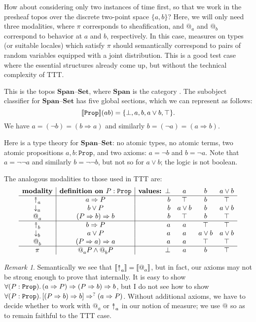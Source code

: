 \documentclass[11pt, oneside, article]{memoir}
\makeatletter
\theoremstyle{plain}
\theoremstyle{definition}
\theoremstyle{remark}
\newtheorem{remark}[theorem]{Remark}
\DeclarePairedDelimiter{\church}{\llbracket}{\rrbracket}
\newcommand{\const}[1]{\mathtt{#1}}
\newcommand{\Cat}[1]{\mathbf{#1}}
\newcommand{\smset}{\Cat{Set}}
\newcommand{\from}{\leftarrow}
\newcommand{\Prop}{\const{Prop}}
\newcommand{\AtSymbol}{{@}}
\newcommand{\SeeSymbol}{{\down}}  %
\newcommand{\InSymbol}{{\upclose}}%
\newcommand{\At}[2][]{\AtSymbol^{#1}_{#2}}
\newcommand{\See}[2][]{\SeeSymbol^{#1}_{#2}}
\newcommand{\In}[2][]{\InSymbol^{#1}_{#2}}
\newcommand{\upclose}{{\rotatebox[origin=c]{90}{$\twoheadrightarrow$}}}
\newcommand{\down}{\mathord{\downarrow}}
\newcommand{\imp}{\Rightarrow}
\newcommand{\Span}{\Cat{Span}}
\newcommand{\set}{\text{--}\smset}
\makeatother
\begin{document}

How about considering only two instances of time first, so that we work in the presheaf topos over the discrete two-point space $\{a,b\}$? Here, we will only need three modalities, where $\pi$ corresponds to sheafification, and $\At{a}{}$ and $\At{b}{}$ correspond to behavior at $a$ and $b$, respectively. In this case, measures on types (or suitable locales) which satisfy $\pi$ should semantically correspond to pairs of random variables equipped with a joint distribution. This is a good test case where the essential structures already come up, but without the technical complexity of TTT.

This is the topos $\Span\set$, where $\Span$ is the category \fbox{$a\from ab\to b$}. The subobject classifier for $\Span\set$ has five global sections, which we can represent as follows:
\[\church{\Prop}(ab)=\{\bot,a,b,a\vee b,\top\}.\]
We have $a=(\neg b)=(b\imp a)$ and similarly $b=(\neg a)=(a\imp b)$.

Here is a type theory for $\Span\set$: no atomic types, no atomic terms, two atomic propositions $a,b:\Prop$, and two axioms: $a=\neg b$ and $b=\neg a$. Note that $a=\neg\neg a$ and similarly $b=\neg\neg b$, but not so for $a\vee b$; the logic is not boolean.

The analogous modalities to those used in TTT are:
\[
\begin{array}{c|c|rccc}
	\textbf{modality}&\textbf{definition on } P:\Prop&\textbf{values: }\bot&a&b&a\vee b \\\hline
	\In{a}&a\imp P&b&\top&b&\top\\
	\See{a}&b\vee P&b&a\vee b&b&a\vee b\\
	\At{a}&(P\imp b)\imp b&b&\top&b&\top\\\hline
	\In{b}&b\imp P&a&a&\top&\top\\
	\See{b}&a\vee P&a&a&a\vee b&a\vee b\\
	\At{b}&(P\imp a)\imp a&a&a&\top&\top\\\hline
	\pi&\At{a}P\wedge\At{b}P&\bot&a&b&\top
\end{array}
\]

\begin{remark}
Semantically we see that $\church{\In{a}}=\church{\At{a}}$, but in fact, our axioms may not be strong enough to prove that internally. It is easy to show $\forall(P:\Prop)\ldotp(a\imp P)\imp(P\imp b)\imp b$, but I do not see how to show $\forall(P:\Prop)\ldotp[(P\imp b)\imp b]\imp^? (a\imp P)$. Without additional axioms, we have to decide whether to work with $\At{a}$ or $\In{a}$ in our notion of measure; we use $\At{}$ so as to remain faithful to the TTT case. 
\end{remark}
\end{document}

